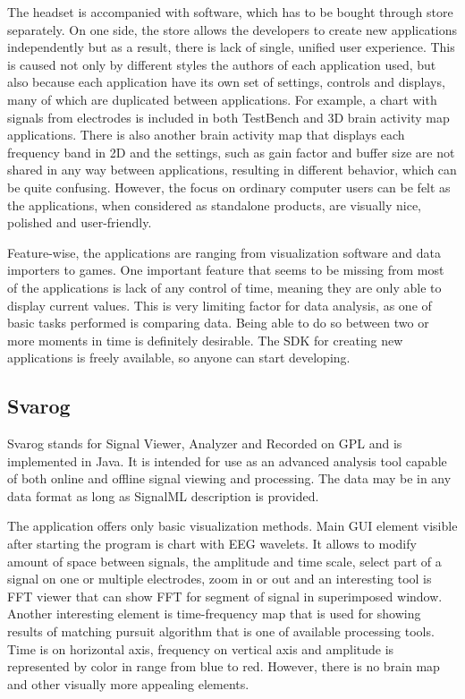 The headset is accompanied with software, which has to be bought through store
separately. On one side, the store allows the developers to create new
applications independently but as a result, there is lack of single, unified
user experience. This is caused not only by different styles the authors of each
application used, but also because each application have its own set of
settings, controls and displays, many of which are duplicated between
applications. For example, a chart with signals from electrodes is included in
both TestBench and 3D brain activity map applications. There is also another
brain activity map that displays each frequency band in 2D and the settings,
such as gain factor and buffer size are not shared in any way between
applications, resulting in different behavior, which can be quite confusing.
However, the focus on ordinary computer users can be felt as the applications,
when considered as standalone products, are visually nice, polished and
user-friendly.

Feature-wise, the applications are ranging from visualization software and data
importers to games. One important feature that seems to be missing from most of
the applications is lack of any control of time, meaning they are only able to
display current values. This is very limiting factor for data analysis, as one of
basic tasks performed is comparing data. Being able to do so between two or more
moments in time is definitely desirable. The SDK for creating new applications
is freely available, so anyone can start developing.

\subsection{Svarog}
Svarog stands for Signal Viewer, Analyzer and Recorded on GPL and is
implemented in Java. It is intended for use as an advanced analysis tool capable
of both online and offline signal viewing and processing. The data may be in any
data format as long as SignalML description is provided.

The application offers only basic visualization methods. Main GUI element
visible after starting the program is chart with EEG wavelets. It allows to
modify amount of space between signals, the amplitude and time scale, select
part of a signal on one or multiple electrodes, zoom in or out and an
interesting tool is FFT viewer that can show FFT for segment of signal in
superimposed window. Another interesting element is time-frequency map that is
used for showing results of matching pursuit algorithm that is one of available
processing tools. Time is on horizontal axis, frequency on vertical axis and
amplitude is represented by color in range from blue to red. However, there is
no brain map and other visually more appealing elements.

